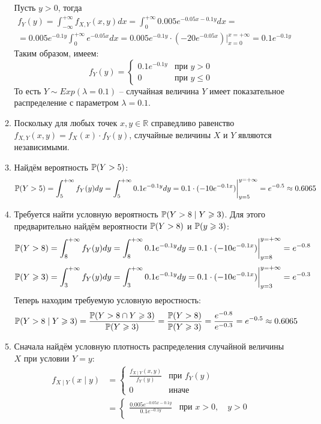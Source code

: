 \begin{enumerate}
\begin{enumerate}
Пусть $y > 0 $, тогда
\begin{multline*}
f_Y (y) = \int_{-\infty}^{+\infty} f_{X, Y} (x, y) dx  = \int_{0}^{+\infty} 0.005 e^{-0.05x-0.1y} dx = \\
= 0.005e^{-0.1y} \int_{0}^{+\infty} e^{-0.05x} dx = 0.005e^{-0.1y} \cdot \left(-20e^{-0.05x} \right) \bigg\vert_{x=0}^{x=+\infty} = 0.1 e^{-0.1y}
\end{multline*}
Таким образом, имеем:
\[
f_Y (y) = \begin{cases}
0.1 e^{-0.1y} & \text{при } y>0 \\
0 & \text{при } y \leq 0
\end{cases}
\]
То есть $Y \sim Exp(\lambda=0.1)$ – случайная величина $Y$ имеет показательное распределение с параметром $\lambda = 0.1$.
\item Поскольку для любых точек $x, y \in \mathbb{R}$ справедливо равенство $f_{X, Y} (x, y) = f_X (x) \cdot f_Y (y)$, случайные величины $X$ и $Y$ являются независимыми.
\item Найдём вероятность $\P(Y>5)$:
\[
\P(Y>5) = \int_{5}^{+\infty} f_Y (y) dy = \int_{5}^{+\infty}  0.1 e^{-0.1y} dy = 0.1 \cdot (-10 e^{-0.1x}) \bigg\vert_{y=5}^{y=+\infty} = e^{-0.5} \approx0.6065
\]
\item Требуется найти условную вероятность $\P(Y>8 \mid Y \geq 3)$. Для этого предварительно найдём вероятности $\P(Y>8)$ и $\P(y \geq 3)$:
\[
\P(Y>8) = \int_{8}^{+\infty} f_Y (y) dy  = \int_{8}^{+\infty}  0.1 e^{-0.1y} dy = 0.1 \cdot (-10 e^{-0.1x}) \bigg\vert_{y=8}^{y=+\infty} = e^{-0.8}
\]
\[
\P(Y \geq 3) =  \int_{3}^{+\infty} f_Y (y) dy   =  \int_{3}^{+\infty}  0.1 e^{-0.1y} dy = 0.1 \cdot (-10 e^{-0.1x}) \bigg\vert_{y=3}^{y=+\infty} = e^{-0.3}
\]
Теперь находим требуемую условную веростность:
\[
\P(Y>8 \mid Y \geq 3) = \frac{\P(Y > 8 \cap
Y \geq 3)}{\P(Y \geq 3)} = \frac{\P(Y>8)}{\P(Y \geq 3) } = \frac{e^{-0.8}}{e^{-0.3}} = e^{-0.5} \approx0.6065
\]
\item Сначала найдём условную плотность распределения случайной величины $X$ при условии $Y=y$:
\begin{align*}
f_{X \mid Y} (x \mid y) &=
\begin{cases}
\frac{f_{X \mid Y} (x, y)}{f_Y (y)} & \text{при } f_Y (y) \\
0 & \text{иначе}
\end{cases} \\
&=
\begin{cases}
\frac{0.005e^{-0.05x-0.1y}}{0.1e^{-0.1y}} & \text{при } x>0, \quad y>0 \\

\end{cases}
\end{align*}
\end{enumerate}
\end{enumerate}

